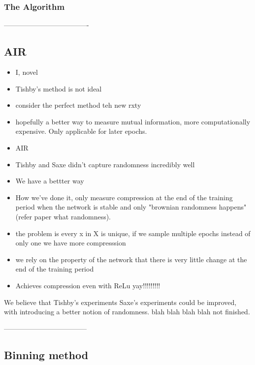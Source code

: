 \documentclass[dissertation.tex]{subfiles}
\begin{document}
\subsubsection{The Algorithm}


-------------------------------------


\subsection{AIR}

\begin{itemize}
  \item{
      I, novel
    }
  \item{
      Tishby's method is not ideal
    }
  \item{
      consider the perfect method teh new rxty
    }
  \item{
      hopefully a better way to measure mutual information, more computationally
      expensive. Only applicable for later epochs.
    }
  \item{
      AIR
    }
\end{itemize}


\begin{itemize}
  \item{
      Tishby and Saxe didn't capture randomness incredibly well 
    }
  \item{
      We have a bettter way
    }
  \item{
      How we've done it, only measure compression at the end of the training
      period when the network is stable and only "brownian randomness
      happens"(refer paper what randomness).
    }
  \item{
      the problem is every x in X is unique, if we sample multiple epochs
      instead of only one we have more compresssion
    }
  \item{
      we rely on the property of the network that there is very little change at
      the end of the training period
    }
  \item{
      Achieves compression even with ReLu yay!!!!!!!!!
    }
\end{itemize}


We believe that Tishby's experiments Saxe's experiments could be improved, with
introducing a better notion of randomness. blah blah blah blah not finished.


------------------------------------

\subsection{Binning method} 
\end{document}

